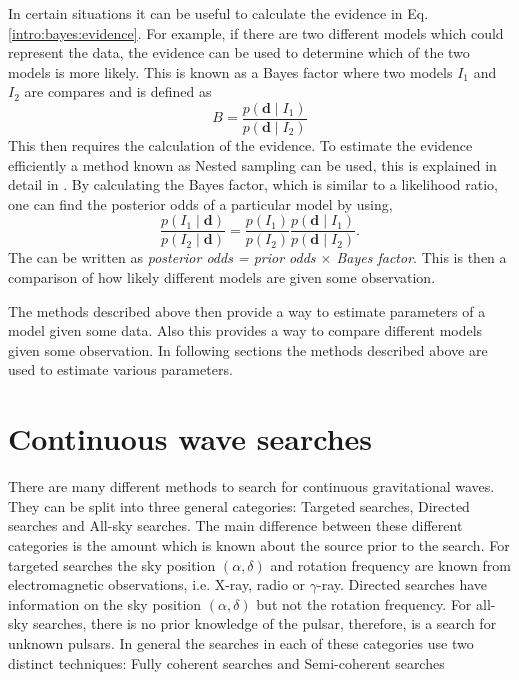 In certain situations it can be useful to calculate the evidence in Eq.\ref{intro:bayes:evidence}. 
For example, if there are two different models which could represent the data, the evidence can be used to determine which of the two models is more likely.
This is known as a Bayes factor where two models $I_1$ and $I_2$ are compares and is defined as
\begin{equation}
B = \frac{p({\bm d} \mid I_1)}{p({\bm d} \mid I_2)}
\end{equation}
This then requires the calculation of the evidence.
To estimate the evidence efficiently a method known as Nested sampling can be used, this is explained in detail in \citep{skilling2006NestedSampling,speagle2019DynestyDynamic}.
By calculating the Bayes factor, which is similar to a likelihood ratio, one can find the posterior odds of a particular model by using,
\begin{equation}
\frac{p(I_1 \mid \mathbf{d})}{p(I_2 \mid \mathbf{d})} = \frac{p(I_1)}{p(I_2)} \frac{p(\mathbf{d} \mid I_1)}{p(\mathbf{d} \mid I_2)}.
\end{equation}
The can be written as \textit{posterior odds = prior odds $\times$ Bayes factor}. This is then a comparison of how likely different models are given some observation. 

The methods described above then provide a way to estimate parameters of a model given some data. 
Also this provides a way to compare different models given some observation.
In following sections the methods described above are used to estimate various parameters.


\section{\label{searchcw:search} Continuous wave searches}

There are many different methods to search for continuous gravitational waves.
They can be split into three general categories: Targeted searches, Directed searches and All-sky searches.
The main difference between these different categories is the amount which is known about the source prior to the search.
For targeted searches the sky position $(\alpha,\delta)$ and rotation frequency are known from electromagnetic observations, i.e. X-ray, radio or $\gamma$-ray.
Directed searches have information on the sky position $(\alpha,\delta)$ but not the rotation frequency.
For all-sky searches, there is no prior knowledge of the pulsar, therefore, is a search for unknown pulsars.
In general the searches in each of these categories use two distinct techniques: Fully coherent searches and Semi-coherent searches

